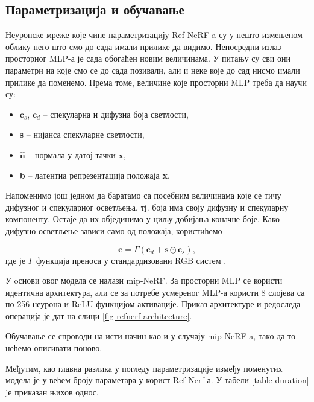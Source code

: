 \documentclass[12pt, a4paper, twoside]{book}
\numberwithin{equation}{chapter}
\numberwithin{theorem}{section}
\numberwithin{definition}{section}
\numberwithin{definitionChapter}{chapter}
\begin{document}
\subsection{Параметризација и обучавање}
Неуронске мреже које чине параметризацију Ref-NeRF-a су у нешто измењеном облику него што смо до сада имали прилике
да видимо. Непосредни излаз просторног MLP-а је сада обогаћен новим величинама. У питању су сви они параметри
на које смо се до сада позивали, али и неке које до сад нисмо имали прилике да поменемо. Према томе,
величине које просторни MLP треба да научи су:

	\begin{itemize}
		\item $\textbf{c}_s$, $\textbf{c}_d$ -- спекуларна и дифузна боја светлости,
		\item \textbf{s} -- нијанса спекуларне светлости,
		\item $\hat{\textbf{n}}$ -- нормала у датој тачки $\textbf{x}$,
		\item \textbf{b} -- латентна репрезентација положаја \textbf{x}. 
	\end{itemize}

Напоменимо још једном да баратамо са посебним величинама које се тичу дифузног и спекуларног осветљења, тј. боја има
своју дифузну и спекуларну компоненту. Остаје да их објединимо у циљу добијања коначне боје. Како дифузно
осветљење зависи само од положаја, користићемо

\begin{equation}
	\textbf{c} = \Gamma(\textbf{c}_d + \textbf{s} \odot \textbf{c}_s),
	\label{eqn-tone}
\end{equation}
где је $\Gamma$ функција преноса у стандардизовани RGB систем \cite{sgrb}.

У oснови овог модела се налази mip-NeRF. За просторни MLP се користи идентична архитектура, али се за потребе усмереног
MLP-а користи 8 слојева са по 256 неурона и ReLU функцијом активације. Приказ архитектуре и редоследа операција је 
дат на слици \ref{fig-refnerf-architecture}.

Обучавање се спроводи на исти начин као и у случају mip-NeRF-a, тако да то нећемо описивати поново.

Међутим, као главна разлика у погледу параметризације између поменутих модела је у већем броју параметара у корист
Ref-Nerf-а. У табели \ref{table-duration} jе приказан њихов однос.
\end{document}
